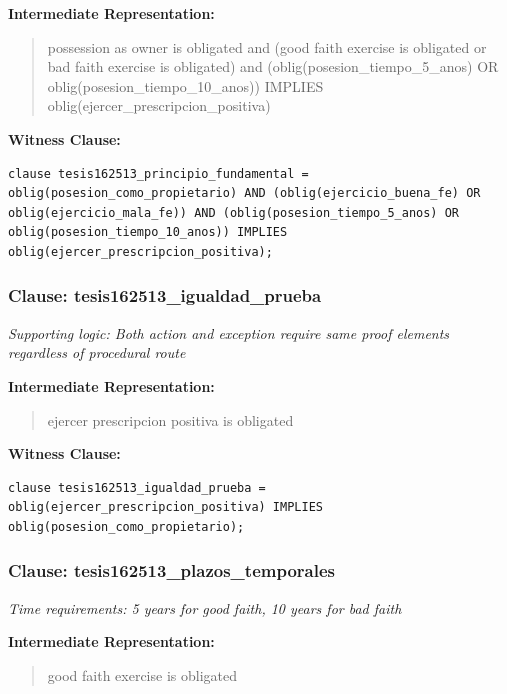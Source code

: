 \documentclass[11pt,a4paper]{article}
\begin{document}
\textbf{Intermediate Representation:}

\begin{quote}
possession as owner is obligated and (good faith exercise is obligated or bad faith exercise is obligated) and (oblig(posesion\_tiempo\_5\_anos) OR oblig(posesion\_tiempo\_10\_anos)) IMPLIES oblig(ejercer\_prescripcion\_positiva)
\end{quote}

\textbf{Witness Clause:}

\begin{lstlisting}[style=witnessstyle, language=Witness]
clause tesis162513_principio_fundamental = oblig(posesion_como_propietario) AND (oblig(ejercicio_buena_fe) OR oblig(ejercicio_mala_fe)) AND (oblig(posesion_tiempo_5_anos) OR oblig(posesion_tiempo_10_anos)) IMPLIES oblig(ejercer_prescripcion_positiva);
\end{lstlisting}

\subsubsection{Clause: tesis162513\_igualdad\_prueba}

\textit{Supporting logic: Both action and exception require same proof elements regardless of procedural route}

\textbf{Intermediate Representation:}

\begin{quote}
ejercer prescripcion positiva is obligated
\end{quote}

\textbf{Witness Clause:}

\begin{lstlisting}[style=witnessstyle, language=Witness]
clause tesis162513_igualdad_prueba = oblig(ejercer_prescripcion_positiva) IMPLIES oblig(posesion_como_propietario);
\end{lstlisting}

\subsubsection{Clause: tesis162513\_plazos\_temporales}

\textit{Time requirements: 5 years for good faith, 10 years for bad faith}

\textbf{Intermediate Representation:}

\begin{quote}
good faith exercise is obligated
\end{quote}
\end{document}
